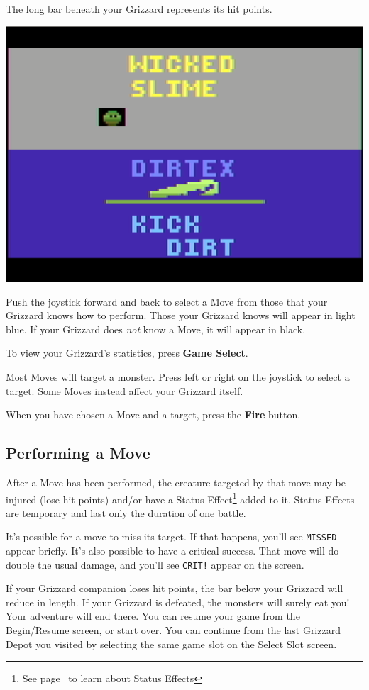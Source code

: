 \documentclass[9pt,twocolumn,openany,article]{memoir}
\begin{document}
The long bar beneath your Grizzard represents its hit points.

\begin{center}
  \includegraphics[width=.6667\columnwidth]{../Manual/GrizzardCombatNTSC.png}
\end{center}

Push the joystick forward and back to select a Move from those that your
Grizzard knows how to perform. Those  your Grizzard knows will appear in
light blue. If your Grizzard does \emph{not} know a Move, it will appear
in black.

To view your Grizzard's statistics, press \textbf{Game Select}.

Most Moves will target a monster. Press left or right on the joystick to
select a target. Some Moves instead affect your Grizzard itself.

When   you   have   chosen   a    Move   and   a   target,   press   the
\textbf{Fire} button.


\subsection{Performing a Move}

After a Move has been performed,  the creature targeted by that move may
be injured  (lose hit points)  and/or have a  Status Effect\footnote{See
  page~\pageref{sec:StatusEffects} to learn  about Status Effects} added
to  it. Status  Effects  are temporary  and last  only  the duration  of
one battle.

It's possible for a move to miss its target. If that happens, you'll see
\texttt{MISSED} appear  briefly. It's also  possible to have  a critical
success.  That move  will do  double the  usual damage,  and you'll  see
\texttt{CRIT!} appear on the screen.

If your Grizzard companion loses hit points, the bar below your Grizzard
will reduce in  length. If your Grizzard is defeated,  the monsters will
surely eat you! Your adventure will end there. \ifdefined\NOSAVE You can
resume your game from the Begin/Resume  screen, or start over. \else You
can continue from  the last Grizzard Depot you visited  by selecting the
same game slot on the Select Slot screen. \fi
\end{document}
